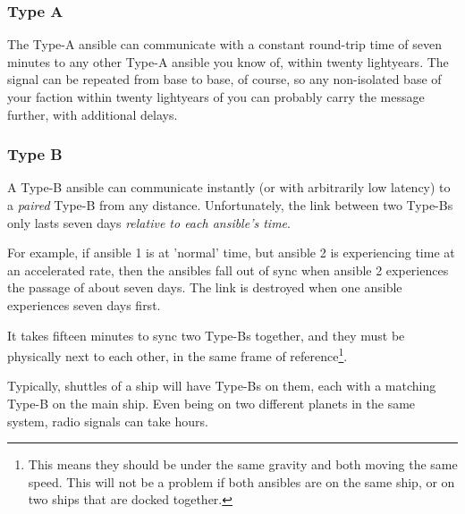 \subsubsection{Type A}
\par
The Type-A ansible can communicate with a constant round-trip time of seven minutes to any other Type-A ansible you know of, within twenty lightyears. The signal can be repeated from base to base, of course, so any non-isolated base of your faction within twenty lightyears of you can probably carry the message further, with additional delays.

\subsubsection{Type B}
\par
A Type-B ansible can communicate instantly (or with arbitrarily low latency) to a \textit{paired} Type-B from any distance. Unfortunately, the link between two Type-Bs only lasts seven days \textit{relative to each ansible's time}.

\par
For example, if ansible 1 is at 'normal' time, but ansible 2 is experiencing time at an accelerated rate, then the ansibles fall out of sync when ansible 2 experiences the passage of about seven days. The link is destroyed when one ansible experiences seven days first.

\par
It takes fifteen minutes to sync two Type-Bs together, and they must be physically next to each other, in the same frame of reference\footnote{This means they should be under the same gravity and both moving the same speed. This will not be a problem if both ansibles are on the same ship, or on two ships that are docked together.}.

\par
Typically, shuttles of a ship will have Type-Bs on them, each with a matching Type-B on the main ship. Even being on two different planets in the same system, radio signals can take hours.